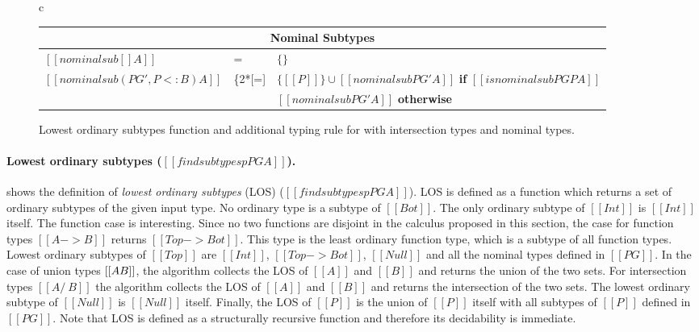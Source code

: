 \begin{figure}[t]
\begin{center}
    \begin{tabular}{c}
      {\renewcommand{\arraystretch}{1.5}
       \begin{tabular}{|lll|}
        \multicolumn{3}{c}{Nominal Subtypes \fbox{$[[nominalsub PG A]]$}} \\[0.8mm]
        \hline
        $[[nominalsub [] A]]$ & = & $\{\}$ \\
        \multirow{2}{*}{$[[nominalsub (PG', P <: B) A]]$} & \ldelim\{{2}{*}[=] & $\{[[P]]\} \cup [[nominalsub PG' A]]$ {\textbf{if}} $[[isnominalsub PG P A]]$ \\
                                                               & & $[[nominalsub PG' A]]$ \textbf{otherwise} \\
        \hline
        \end{tabular} }
    \end{tabular}
\end{center}



  \caption{Lowest ordinary subtypes function and additional typing rule for \name with intersection types and nominal types.}
  \label{fig:inter:los}
\end{figure}


\paragraph*{Lowest ordinary subtypes ($[[findsubtypesp PG A]]$).}
 shows the definition of
\emph{lowest ordinary subtypes} (LOS) ($[[findsubtypesp PG A]]$).
LOS is defined as a function which
returns a set of ordinary subtypes of the given input type.
No ordinary type is a subtype of $[[Bot]]$. The only ordinary
subtype of $[[Int]]$ is $[[Int]]$ itself. The function case is
interesting. Since no two functions are disjoint in the calculus
proposed in this section, the case for function types $[[A -> B]]$ returns $[[Top
    -> Bot]]$. This type is the least ordinary function type, which is a subtype
of all function types.
Lowest ordinary subtypes of $[[Top]]$ are $[[Int]]$, $[[Top -> Bot]]$,
$[[Null]]$ and all the nominal types defined in $[[PG]]$.
In the case of union types $[[A \/ B]]$, the
algorithm collects the LOS of $[[A]]$ and $[[B]]$ and returns the union of the
two sets. For intersection types $[[A /\ B]]$
the algorithm collects the LOS of $[[A]]$ and $[[B]]$
and returns the intersection of the two sets.
The lowest ordinary subtype of $[[Null]]$ is $[[Null]]$ itself.
Finally, the LOS of $[[P]]$ is the union of $[[P]]$ itself with all subtypes
of $[[P]]$ defined in $[[PG]]$.
Note that LOS is defined as a structurally recursive function and therefore
its decidability is immediate.

